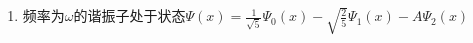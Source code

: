 
\subsection{ }
\begin{enumerate}
\item 频率为$\omega$的谐振子处于状态$\varPsi (x)=\frac{1}{\sqrt{5}}\varPsi_{0} (x)-\sqrt{\frac{2}{5}}\varPsi_{1} (x)-A\varPsi_2 (x)$
\end{enumerate}